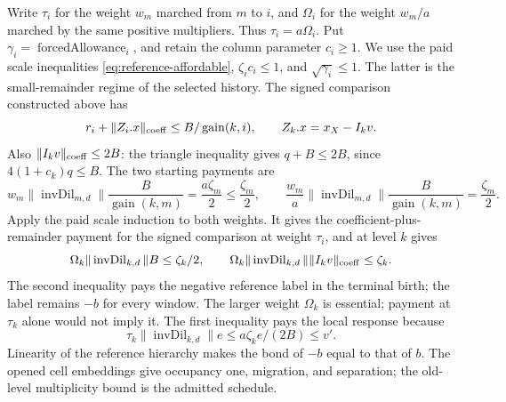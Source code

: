 Write $\tau_i$ for the weight $w_m$ marched from $m$ to $i$, and
$\Omega_i$ for the weight $w_m/a$ marched by the same positive
multipliers. Thus $\tau_i=a\Omega_i$. Put $\gamma_i=
\operatorname{forcedAllowance}_i$, and retain the column parameter
$c_i\ge1$. We use the paid scale inequalities
\eqref{eq:reference-affordable}, $\zeta_ic_i\le1$, and
$\sqrt{\gamma_i}\le1$. The latter is the small-remainder regime of
the selected history. The signed comparison constructed above has
\[
 r_i+\|Z_i.x\|_{\rm coeff}\le B/\operatorname{gain}(k,i),
 \qquad Z_k.x=x_X-I_kv.
\]
Also $\|I_kv\|_{\rm coeff}\le2B$: the triangle inequality gives
$q+B\le2B$, since $4(1+c_k)q\le B$. The two starting payments are
\begin{equation}\label{eq:coffer-double-payment}
 w_m\|\operatorname{invDil}_{m,d}\|\frac{B}{\operatorname{gain}(k,m)}
       =\frac{a\zeta_m}{2}\le\frac{\zeta_m}{2},\qquad
 \frac{w_m}{a}\|\operatorname{invDil}_{m,d}\|
       \frac{B}{\operatorname{gain}(k,m)}=\frac{\zeta_m}{2}.
\end{equation}
Apply the paid scale induction to both weights. It gives the
coefficient-plus-remainder payment for the signed comparison at
weight $\tau_i$, and at level $k$ gives
\[
 \Omega_k\|\operatorname{invDil}_{k,d}\|B\le\zeta_k/2,
 \qquad
 \Omega_k\|\operatorname{invDil}_{k,d}\|\|I_kv\|_{\rm coeff}
       \le\zeta_k.
\]
The second inequality pays the negative reference label in the
terminal birth; the label remains $-b$ for every window. The larger
weight $\Omega_k$ is essential; payment at $\tau_k$ alone would not
imply it. The first inequality pays the local response because
\[
 \tau_k\|\operatorname{invDil}_{k,d}\|e
 \leq a\zeta_k e/(2B)\leq v'.
\]
Linearity of the reference hierarchy makes the bond of $-b$ equal to
that of $b$. The opened cell embeddings give occupancy one,
migration, and separation; the old-level multiplicity bound is the
admitted schedule.

